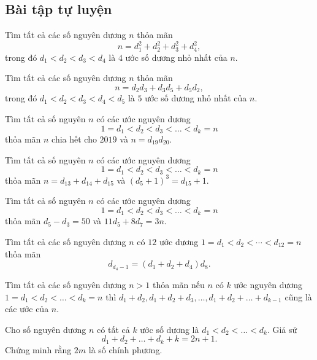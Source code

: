 \subsection*{Bài tập tự luyện}

\begin{btt}
Tìm tất cả các số nguyên dương $n$ thỏa mãn $$n=d^2_1+d^2_2+d^2_3+d^2_4,$$ trong đó $d_1<d_2<d_3<d_4$ là $4$ ước số dương nhỏ nhất của $n.$
\end{btt}

\begin{btt}
Tìm tất cả các số nguyên dương $n$ thỏa mãn $$n=d_2d_3+d_3d_5+d_5d_2,$$ trong đó $d_1<d_2<d_3<d_4<d_5$ là $5$ ước số dương nhỏ nhất của $n.$
\end{btt}

\begin{btt}
Tìm tất cả số nguyên $n$ có các ước nguyên dương $$1=d_1<d_2<d_3<\ldots<d_{k}=n$$ thỏa mãn $n$ chia hết cho $2019$ và $n=d_{19}d_{20}.$
\end{btt}

\begin{btt}
Tìm tất cả số nguyên $n$ có các ước nguyên dương $$1=d_1<d_2<d_3<\ldots<d_{k}=n$$ thỏa mãn $n=d_{13}+d_{14}+d_{15}$ và $\left(d_5+1\right)^3=d_{15}+1.$ 
\end{btt}

\begin{btt}
Tìm tất cả số nguyên $n$ có các ước nguyên dương $$1=d_1<d_2<d_3<\ldots<d_{k}=n$$ thỏa mãn $d_5-d_3=50$ và $11d_5+8d_7=3n.$
\end{btt}

\begin{btt}
Tìm tất cả các số nguyên dương $n$ có $12$ ước dương $1=d_{1}<d_{2}<\cdots<d_{12}=n$ thỏa mãn \[d_{d_4-1}=\left(d_1+d_2+d_4\right)d_8.\]
\end{btt}

\begin{btt}
Tìm tất cả các số nguyên dương $n>1$ thỏa mãn nếu $n$ có $k$ ước nguyên dương $1=d_1<d_2<\ldots <d_k=n$ thì $d_1+d_2,d_1+d_2+d_3,\ldots ,d_1+d_2+\ldots+d_{k-1}$ cũng là các ước của $n$. 
\end{btt}

\begin{btt}
Cho số nguyên dương $n$ có tất cả $k$ ước số dương là $d_{1}< d_{2}< \ldots<d_{k}$. Giả sử
$$d_{1}+d_{2}+\ldots+d_{k}+k=2 n+1.$$ Chứng minh rằng $2m$ là số chính phương.
\end{btt}

